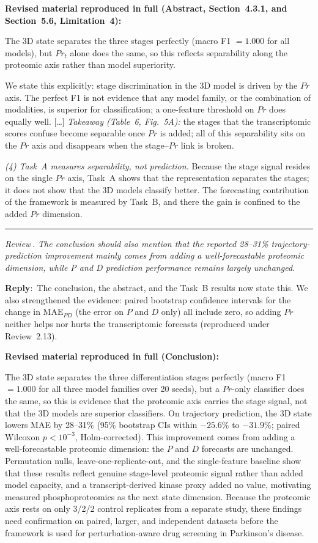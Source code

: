 \documentclass[11pt]{article}
\newcounter{reviewer}
\newcounter{point}[reviewer]
\renewcommand{\thepoint}{Review\,\thereviewer.\arabic{point}}
\newcommand{\point}[1]{\refstepcounter{point}  \bigskip \hrule \medskip \noindent \textit{{\fontseries{b}\selectfont \thepoint } #1}\par}
\newcommand{\reply}{\medskip \noindent \textbf{Reply}:\ }
\newcommand{\revisedheading}[1]{\medskip\noindent\textbf{Revised material
  reproduced in full (#1):}\par}
\newenvironment{revised}{\par\color{red}}{\par}
\begin{document}
\revisedheading{Abstract, Section~4.3.1, and Section~5.6, Limitation~4}
\begin{revised}
The 3D state separates the three stages perfectly (macro F1 $= 1.000$ for all models), but $Pr_{t}$ alone does the same, so this reflects separability along the proteomic axis rather than model superiority.

We state this explicitly: stage discrimination in the 3D model is driven by the $Pr$ axis. The perfect F1 is not evidence that any model family, or the combination of modalities, is superior for classification; a one-feature threshold on $Pr$ does equally well. [\ldots] \textit{Takeaway (Table~6, Fig.~5A):} the stages that the transcriptomic scores confuse become separable once $Pr$ is added; all of this separability sits on the $Pr$ axis and disappears when the stage--$Pr$ link is broken.

\textit{(4) Task~A measures separability, not prediction.} Because the stage signal resides on the single $Pr$ axis, Task~A shows that the representation separates the stages; it does not show that the 3D models classify better. The forecasting contribution of the framework is measured by Task~B, and there the gain is confined to the added $Pr$ dimension.
\end{revised}

\point{The conclusion should also mention that the reported 28--31\% trajectory-prediction improvement mainly comes from adding a well-forecastable proteomic dimension, while P and D prediction performance remains largely unchanged.}

\reply{The conclusion, the abstract, and the Task~B results now state this. We also strengthened the evidence: paired bootstrap confidence intervals for the change in $\text{MAE}_{PD}$ (the error on $P$ and $D$ only) all include zero, so adding $Pr$ neither helps nor hurts the transcriptomic forecasts (reproduced under Review~2.13).}

\revisedheading{Conclusion}
\begin{revised}
The 3D state separates the three differentiation stages perfectly (macro F1 $= 1.000$ for all three model families over 20 seeds), but a $Pr$-only classifier does the same, so this is evidence that the proteomic axis carries the stage signal, not that the 3D models are superior classifiers. On trajectory prediction, the 3D state lowers MAE by 28--31\% (95\% bootstrap CIs within $-25.6\%$ to $-31.9\%$; paired Wilcoxon $p < 10^{-3}$, Holm-corrected). This improvement comes from adding a well-forecastable proteomic dimension: the $P$ and $D$ forecasts are unchanged. Permutation nulls, leave-one-replicate-out, and the single-feature baseline show that these results reflect genuine stage-level proteomic signal rather than added model capacity, and a transcript-derived kinase proxy added no value, motivating measured phosphoproteomics as the next state dimension. Because the proteomic axis rests on only 3/2/2 control replicates from a separate study, these findings need confirmation on paired, larger, and independent datasets before the framework is used for perturbation-aware drug screening in Parkinson's disease.
\end{revised}
\end{document}
